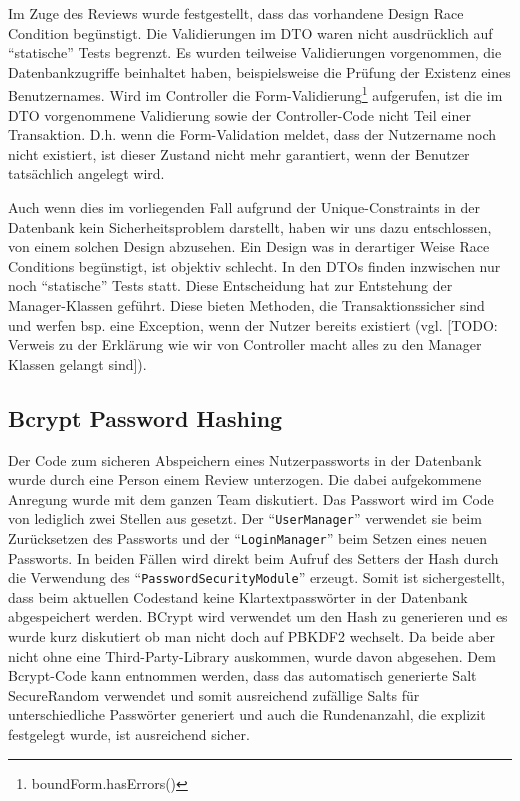 \documentclass[12pt,DIV14,BCOR10mm,a4paper,twoside,parskip=half-,headsepline,headinclude,english,ngerman,bibliography=totocnumbered]{scrreprt}
\begin{document}
Im Zuge des Reviews wurde festgestellt, dass das vorhandene Design Race Condition begünstigt. Die Validierungen im DTO waren nicht ausdrücklich auf \enquote{statische} Tests begrenzt. Es wurden teilweise Validierungen vorgenommen, die Datenbankzugriffe beinhaltet haben, beispielsweise die Prüfung der Existenz eines Benutzernames. Wird im Controller die Form-Validierung\footnote{boundForm.hasErrors()} aufgerufen, ist die im DTO vorgenommene Validierung sowie der Controller-Code nicht Teil einer Transaktion. D.h. wenn die Form-Validation meldet, dass der Nutzername noch nicht existiert, ist dieser Zustand nicht mehr garantiert, wenn der Benutzer tatsächlich angelegt wird.

Auch wenn dies im vorliegenden Fall aufgrund der Unique-Constraints in der Datenbank kein Sicherheitsproblem darstellt, haben wir uns dazu entschlossen, von einem solchen Design abzusehen. Ein Design was in derartiger Weise Race Conditions begünstigt, ist objektiv schlecht. In den DTOs finden inzwischen nur noch \enquote{statische} Tests statt. Diese Entscheidung hat zur Entstehung der Manager-Klassen geführt. Diese bieten Methoden, die Transaktionssicher sind und werfen bsp. eine Exception, wenn der Nutzer bereits existiert (vgl. [TODO: Verweis zu der Erklärung wie wir von Controller macht alles zu den Manager Klassen gelangt sind]).

\subsection{Bcrypt Password Hashing}
Der Code zum sicheren Abspeichern eines Nutzerpassworts in der Datenbank wurde durch eine Person einem Review unterzogen. Die dabei aufgekommene Anregung wurde mit dem ganzen Team diskutiert. Das Passwort wird im Code von lediglich zwei Stellen aus gesetzt. Der \enquote{\texttt{UserManager}} verwendet sie beim Zurücksetzen des Passworts und der \enquote{\texttt{LoginManager}} beim Setzen eines neuen Passworts. In beiden Fällen wird direkt beim Aufruf des Setters der Hash durch die Verwendung des \enquote{\texttt{PasswordSecurityModule}} erzeugt. Somit ist sichergestellt, dass beim aktuellen Codestand keine Klartextpasswörter in der Datenbank abgespeichert werden. BCrypt wird verwendet um den Hash zu generieren und es wurde kurz diskutiert ob man nicht doch auf PBKDF2 wechselt. Da beide aber nicht ohne eine Third-Party-Library auskommen, wurde davon abgesehen. Dem Bcrypt-Code \autocite{BcryptCode} kann entnommen werden, dass das automatisch generierte Salt SecureRandom verwendet und somit ausreichend zufällige Salts für unterschiedliche Passwörter generiert und auch die Rundenanzahl, die explizit festgelegt wurde, ist ausreichend sicher.
\end{document}
